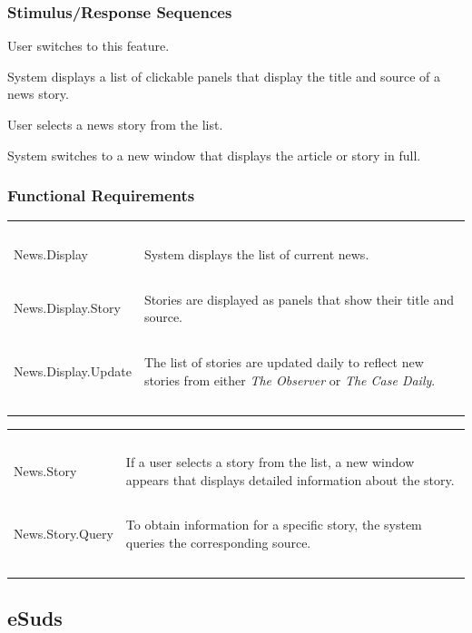 \documentclass[pdftex,12pt,letter]{article}
\begin{document}
\subsubsection{Stimulus/Response Sequences}
\begin{description}\itemsep1pt
\item[Stimulus:] User switches to this feature.
\item[Response:] System displays a list of clickable panels that display the title and source of a news story.
\item[Stimulus:] User selects a news story from the list.
\item[Response:] System switches to a new window that displays the article or story in full.
\end{description}
\subsubsection{Functional Requirements}
\begin{table}[!h]
\begin{tabularx}{\textwidth}[t]{|l Y|}
\hline
~&~\\
News.Display & System displays the list of current news.\\
~&~\\
News.Display.Story & Stories are displayed as panels that show their title and source.\\
~&~\\
News.Display.Update & The list of stories are updated daily to reflect new stories from either \emph{The Observer} or \emph{The Case Daily}.\\
~&~\\
\hline
\end{tabularx}
\end{table}
\begin{table}[!h]
\begin{tabularx}{\textwidth}[t]{|l Y|}
\hline
~&~\\
News.Story & If a user selects a story from the list, a new window appears that displays detailed information about the story.\\
~&~\\
News.Story.Query & To obtain information for a specific story, the system queries the corresponding source.\\
~&~\\
\hline
\end{tabularx}
\end{table}
\FloatBarrier
\subsection{eSuds}
\end{document}
